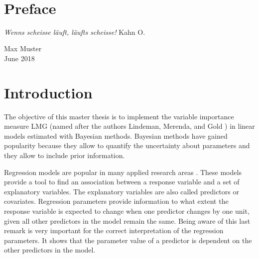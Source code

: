 \documentclass[11pt,a4paper,twoside]{book}\usepackage[]{graphicx}\usepackage[]{color}
\begin{document}


\graphicspath{{./figure/}}
\setcounter{tocdepth}{1}

\newpage
\thispagestyle{empty}~
\newpage
{}

\thispagestyle{plain}
\tableofcontents
{}

\chapter*{Preface}
\thispagestyle{plain}


\textit{Wenns scheisse l\"auft, l\"aufts scheisse!} Kahn O.

\bigskip

\begin{flushright}
Max Muster\\
June 2018
\end{flushright}


\cleardoublepage
{}












\chapter{Introduction}

The objective of this master thesis is to implement the variable importance measure LMG (named after the authors Lindeman, Merenda, and Gold \citep{Gromping2007}) in linear models estimated with Bayesian methods. Bayesian methods have gained popularity because they allow to quantify the uncertainty about parameters and they allow to include prior information.

Regression models are popular in many applied research areas \citep{Nimon2013}. These models provide a tool to find an association between a response variable and a set of explanatory variables. The explanatory variables are also called predictors or covariates. Regression parameters provide information to what extent the response variable is expected to change when one predictor changes by one unit, given all other predictors in the model remain the same. Being aware of this last remark is very important for the correct interpretation of the regression parameters. It shows that the parameter value of a predictor is dependent on the other predictors in the model.
\end{document}
